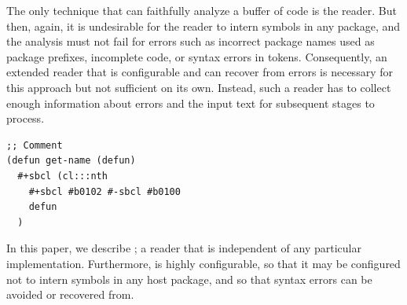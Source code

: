 \begin{description}
  The only technique that can faithfully analyze a buffer of \cl{}
  code is the reader.  But then, again, it is undesirable for the
  reader to intern symbols in any package, and the analysis must not
  fail for errors such as incorrect package names used as package
  prefixes, incomplete code, or syntax errors in tokens.
  Consequently, an extended \cl{} reader that is configurable and can
  recover from errors is necessary for this approach but not
  sufficient on its own.  Instead, such a reader has to collect enough
  information about errors and the input text for subsequent stages to
  process.
\end{description}

\begin{listing}
\begin{verbatim}
;; Comment
(defun get-name (defun)
  #+sbcl (cl:::nth
    #+sbcl #b0102 #-sbcl #b0100
    defun
  )
\end{verbatim}
\caption{A \cl{} program with multiple errors and style issues that a
  user could type into an editor buffer.}
\label{lis:bad-program}
\end{listing}

\noindent
In this paper, we describe \eclector{}; a \cl{} reader that is
independent of any particular \cl{} implementation.  Furthermore,
\eclector{} is highly configurable, so that it may be configured not
to intern symbols in any host package, and so that syntax errors can
be avoided or recovered from.

